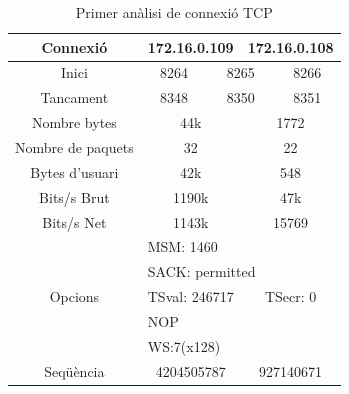\documentclass{article}
\begin{document}
\begin{table}[!h]
\centering
\begin{tabular}{c|cccccc}
Connexió &\multicolumn{3}{c}{172.16.0.109} &\multicolumn{3}{c}{172.16.0.108}\\
\hline
Inici &\multicolumn{2}{c}{8264} &\multicolumn{2}{c}{8265} &\multicolumn{2}{c}{8266}\\
\hline
Tancament &\multicolumn{2}{c}{8348} &\multicolumn{2}{c}{8350} 
&\multicolumn{2}{c}{8351}\\
\hline
Nombre bytes &\multicolumn{3}{c}{44k} &\multicolumn{3}{c}{1772}\\
\hline
Nombre de paquets &\multicolumn{3}{c}{32} &\multicolumn{3}{c}{22}\\
\hline
Bytes d'usuari &\multicolumn{3}{c}{42k} &\multicolumn{3}{c}{548}\\
\hline
Bits/s Brut &\multicolumn{3}{c}{1190k} &\multicolumn{3}{c}{47k}\\
\hline
Bits/s Net &\multicolumn{3}{c}{1143k} &\multicolumn{3}{c}{15769}\\
\hline
\multirow{5}{*}{Opcions} &\multicolumn{6}{l}{MSM: 1460} \\
&\multicolumn{6}{l}{SACK: permitted}\\
&\multicolumn{3}{c}{TSval: 246717}
&\multicolumn{3}{c}{TSecr: 0}\\
&\multicolumn{6}{l}{NOP}\\
&\multicolumn{6}{l}{WS:7(x128)}\\
\hline
Seqüència &\multicolumn{3}{c}{4204505787} &\multicolumn{3}{c}{927140671}\\

\end{tabular}
\caption{Primer anàlisi de connexió TCP}
\label{ana:fst}
\end{table}
\end{document}
